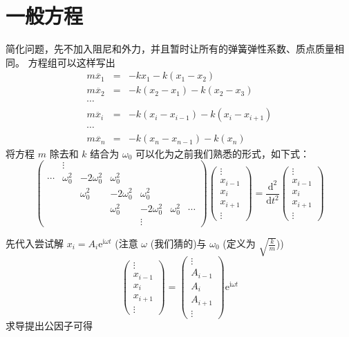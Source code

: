 \documentclass[11pt]{book}
\begin{document}
\section{一般方程}
\label{sec:org700a84a}
简化问题，先不加入阻尼和外力，并且暂时让所有的弹簧弹性系数、质点质量相同。
方程组可以这样写出
\begin{eqnarray*}
\label{eq:4}
m\ddot{x_{1}} &=  &-kx_1-k(x_1-x_2) \\
m\ddot{x_2} & = &-k(x_2-x_1)-k(x_2-x_3)\\
\cdots\\
m\ddot{x_i}&=& -k(x_i-x_{i-1})-k(x_i-x_{i+1})\\
\cdots\\
m\ddot{x_{n}} &=& -k(x_n-x_{n-1})-k(x_{n})
\end{eqnarray*}
将方程 \(m\) 除去和 \(k\) 结合为 \(\omega_0\) 可以化为之前我们熟悉的形式，如下式：
\begin{equation}
\label{eq:3}
\begin{pmatrix}
  & \vdots & \\
\cdots & \omega_0^2 &-2\omega_0^2&\omega_0^2\\
&&\omega_0^2&-2\omega_0^2&\omega_0^2\\
&&&\omega_0^2&-2\omega_0^2&\omega_0^2&\cdots\\
&&&&\vdots
\end{pmatrix}
\begin{pmatrix}
\vdots \\
x_{i-1}\\
x_i\\
x_{i+1}\\
\vdots
\end{pmatrix}
=\frac{\mathrm{d}^2}{\mathrm{d}t^2}
\begin{pmatrix}
\vdots \\
x_{i-1}\\
x_i\\
x_{i+1}\\
\vdots
\end{pmatrix}
\end{equation}

先代入尝试解 \(x_i=A_{i}\mathrm{e}^{\mathrm{i}\omega t}\)
(注意 \(\omega\) (我们猜的)与 \(\omega_{0}\) (定义为 \(\sqrt{\frac{k}{m}}\)))
\begin{equation}
\label{eq:7}
\left(
\begin{array}{c}
\vdots \\x_{i-1}\\x_i\\x_{i+1}\\\vdots
\end{array}
\right)
=
\left(
\begin{array}{c}
\vdots \\A_{i-1}\\A_i\\A_{i+1}\\\vdots
\end{array}
 \right)
\mathrm{e}^{\mathrm{i}\omega t}
\end{equation}
求导提出公因子可得
\end{document}
